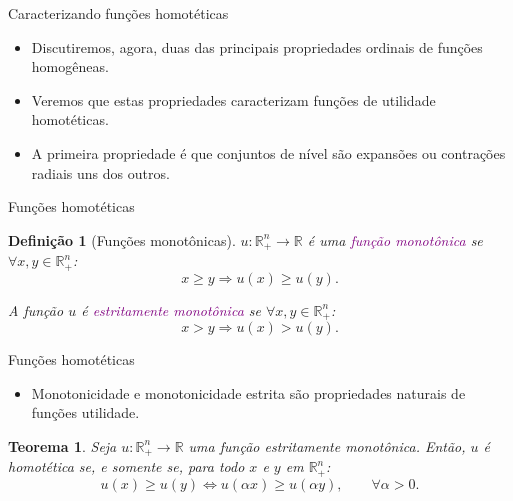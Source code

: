 \documentclass[10pt]{beamer}
\newtheorem{teo}{Teorema}
\newtheorem{defi}{Definição}
\begin{document}
\begin{frame}{Caracterizando funções homotéticas}
    \begin{itemize}
        \item Discutiremos, agora, duas das principais propriedades ordinais de funções homogêneas.
        \bigskip
        \item Veremos que estas propriedades caracterizam funções de utilidade homotéticas.
        \bigskip
        \item A primeira propriedade é que conjuntos de nível são expansões ou contrações radiais uns dos outros.
    \end{itemize}
\end{frame}

\begin{frame}{Funções homotéticas}
    \begin{defi}[Funções monotônicas]
        $u: \mathbb{R}_+^n \to \mathbb{R}$ é uma \textcolor{purple}{função monotônica} se $\forall x, y \in \mathbb{R}_+^n$:
        \[
          x \geq y \Rightarrow u(x) \geq u(y).  
        \]

        A função $u$ é \textcolor{purple}{estritamente monotônica} se $\forall x, y \in \mathbb{R}_+^n$:
        \[
          x > y \Rightarrow u(x) > u(y).  
        \]
    \end{defi}
\end{frame}

\begin{frame}{Funções homotéticas}
    \begin{itemize}
        \item Monotonicidade e monotonicidade estrita são propriedades naturais de funções utilidade.        
    \end{itemize}
    \begin{teo}
        Seja $u: \mathbb{R}_+^n \to \mathbb{R}$ uma função estritamente monotônica. Então, $u$ é homotética se, e somente se, para todo $x$ e $y$ em $\mathbb{R}_+^n$:
        \begin{equation}
            u(x) \geq u(y) \iff u(\alpha x) \geq u(\alpha y), \qquad \forall \alpha>0.
        \end{equation}
    \end{teo}
\end{frame}
\end{document}
